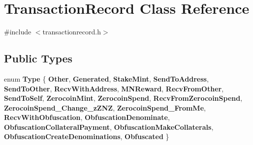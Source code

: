 \hypertarget{class_transaction_record}{}\section{Transaction\+Record Class Reference}
\label{class_transaction_record}


{\ttfamily \#include $<$transactionrecord.\+h$>$}

\subsection*{Public Types}
\begin{DoxyCompactItemize}
\item 
\mbox{\label{class_transaction_record_afb76f5876fba21c3d2c388b98a35d685}} 
enum {\bfseries Type} \{ \newline
{\bfseries Other}, 
{\bfseries Generated}, 
{\bfseries Stake\+Mint}, 
{\bfseries Send\+To\+Address}, 
\newline
{\bfseries Send\+To\+Other}, 
{\bfseries Recv\+With\+Address}, 
{\bfseries M\+N\+Reward}, 
{\bfseries Recv\+From\+Other}, 
\newline
{\bfseries Send\+To\+Self}, 
{\bfseries Zerocoin\+Mint}, 
{\bfseries Zerocoin\+Spend}, 
{\bfseries Recv\+From\+Zerocoin\+Spend}, 
\newline
{\bfseries Zerocoin\+Spend\+\_\+\+Change\+\_\+z\+Z\+NZ}, 
{\bfseries Zerocoin\+Spend\+\_\+\+From\+Me}, 
{\bfseries Recv\+With\+Obfuscation}, 
{\bfseries Obfuscation\+Denominate}, 
\newline
{\bfseries Obfuscation\+Collateral\+Payment}, 
{\bfseries Obfuscation\+Make\+Collaterals}, 
{\bfseries Obfuscation\+Create\+Denominations}, 
{\bfseries Obfuscated}
 \}
\end{DoxyCompactItemize}
